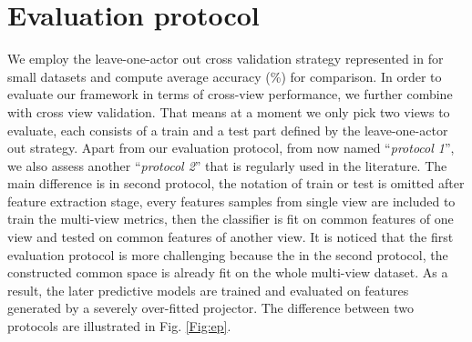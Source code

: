 
\section{Evaluation protocol}
    We employ the leave-one-actor out cross validation strategy represented in \cite{Stone1974} for small datasets and compute average accuracy (\%) for comparison. In order to evaluate our framework in terms of cross-view performance, we further combine with cross view validation. That means at a moment we only pick two views to evaluate, each consists of a train and a test part defined by the leave-one-actor out strategy. Apart from our evaluation protocol, from now named ``\emph{protocol 1}'', we also assess another ``\emph{protocol 2}'' that is regularly used in the literature. The main difference is in second protocol, the notation of train or test is omitted after feature extraction stage, every features samples from single view are included to train the multi-view metrics, then the classifier is fit on common features of one view and tested on common features of another view. It is noticed that the first evaluation protocol is more challenging because the in the second protocol, the constructed common space is already fit on the whole multi-view dataset. As a result, the later predictive models are trained and evaluated on features generated by a severely over-fitted projector. %
    The difference between two protocols are illustrated in Fig. \ref{Fig:ep}. 

